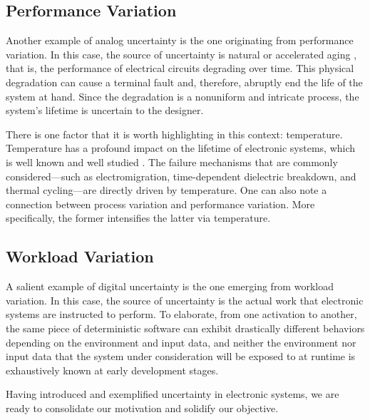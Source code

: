 \subsection{Performance Variation}

Another example of analog uncertainty is the one originating from performance
variation. In this case, the source of uncertainty is natural or accelerated
aging \cite{jedec2016}, that is, the performance of electrical circuits
degrading over time. This physical degradation can cause a terminal fault and,
therefore, abruptly end the life of the system at hand. Since the degradation is
a nonuniform and intricate process, the system's lifetime is uncertain to the
designer.

There is one factor that it is worth highlighting in this context: temperature.
Temperature has a profound impact on the lifetime of electronic systems, which
is well known and well studied \cite{jedec2016}. The failure mechanisms that are
commonly considered---such as electromigration, time-dependent dielectric
breakdown, and thermal cycling---are directly driven by temperature. One can
also note a connection between process variation and performance variation. More
specifically, the former intensifies the latter via temperature.

\subsection{Workload Variation}

A salient example of digital uncertainty is the one emerging from workload
variation. In this case, the source of uncertainty is the actual work that
electronic systems are instructed to perform. To elaborate, from one activation
to another, the same piece of deterministic software can exhibit drastically
different behaviors depending on the environment and input data, and neither the
environment nor input data that the system under consideration will be exposed
to at runtime is exhaustively known at early development stages.

\conclusioncut
Having introduced and exemplified uncertainty in electronic systems, we are
ready to consolidate our motivation and solidify our objective.
